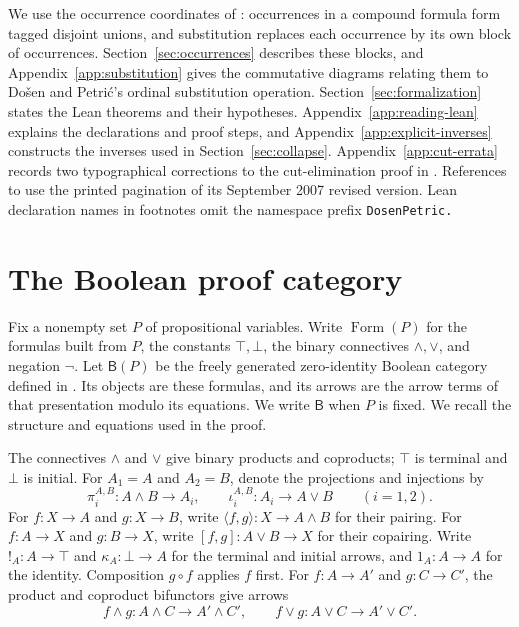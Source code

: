 \documentclass[11pt]{article}
\newcommand{\B}{\mathsf B}
\newcommand{\FormulaSet}{\operatorname{Form}}
\begin{document}
We use the occurrence coordinates of \cite[\S9]{Notation}: occurrences
in a compound formula form tagged disjoint unions, and substitution
replaces each occurrence by its own block of occurrences.
Section~\ref{sec:occurrences} describes these blocks, and
Appendix~\ref{app:substitution} gives the commutative diagrams relating
them to Do\v{s}en and Petri\'c's ordinal substitution operation.
Section~\ref{sec:formalization} states the Lean theorems and their
hypotheses.
Appendix~\ref{app:reading-lean} explains the declarations and proof steps,
and Appendix~\ref{app:explicit-inverses} constructs the inverses used in
Section~\ref{sec:collapse}.
Appendix~\ref{app:cut-errata} records two typographical corrections to the
cut-elimination proof in \cite{DP}.
References to \cite{DP} use the printed
pagination of its September 2007 revised version.
Lean declaration names in footnotes omit the namespace prefix
\texttt{DosenPetric.}

\section{The Boolean proof category}\label{sec:category}

Fix a nonempty set $P$ of propositional variables. Write $\FormulaSet(P)$
for the formulas built from $P$, the constants $\top,\bot$, the binary
connectives $\wedge,\vee$, and negation $\neg$. Let $\B(P)$ be the
freely generated zero-identity Boolean category defined in
\cite[\S\S14.2--14.3]{DP}. Its objects are these formulas, and its
arrows are the arrow terms of that presentation modulo its equations.
We write $\B$ when $P$ is fixed. We recall the structure and equations
used in the proof.

The connectives $\wedge$ and $\vee$ give binary products and coproducts;
$\top$ is terminal and $\bot$ is initial. For $A_1=A$ and $A_2=B$,
denote the projections and injections by
\[
 \pi_i^{A,B}:A\wedge B\longrightarrow A_i,
 \qquad
 \iota_i^{A,B}:A_i\longrightarrow A\vee B
 \qquad(i=1,2).
\]
For $f:X\to A$ and $g:X\to B$, write
$\langle f,g\rangle:X\to A\wedge B$ for their pairing.
For $f:A\to X$ and $g:B\to X$, write
$[f,g]:A\vee B\to X$ for their copairing. Write
$!_A:A\to\top$ and $\kappa_A:\bot\to A$ for the terminal and initial
arrows, and $1_A:A\to A$ for the identity. Composition $g\circ f$
applies $f$ first. For $f:A\to A'$ and $g:C\to C'$, the product and
coproduct bifunctors give arrows
\[
 f\wedge g:A\wedge C\longrightarrow A'\wedge C',
 \qquad f\vee g:A\vee C\longrightarrow A'\vee C'.
\]
\end{document}
